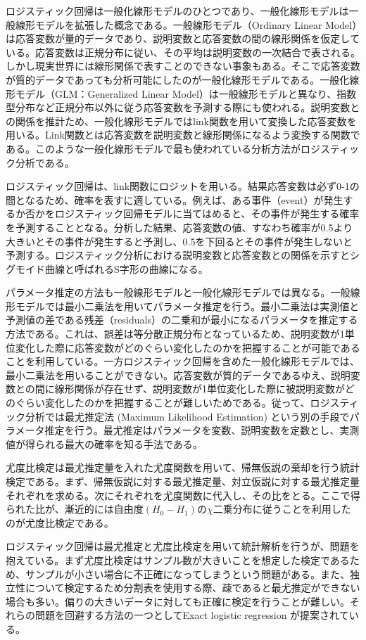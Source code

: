 \documentclass[12pt, dvipdfmx]{jmaster}
\theoremstyle{definition}
\begin{document}
ロジスティック回帰は一般化線形モデルのひとつであり、一般化線形モデルは一般線形モデルを拡張した概念である。一般線形モデル（Ordinary Linear Model）は応答変数が量的データであり、説明変数と応答変数の間の線形関係を仮定している。応答変数は正規分布に従い、その平均は説明変数の一次結合で表される。しかし現実世界には線形関係で表すことのできない事象もある。そこで応答変数が質的データであっても分析可能にしたのが一般化線形モデルである。一般化線形モデル（GLM：Generalized Linear Model）は一般線形モデルと異なり、指数型分布など正規分布以外に従う応答変数を予測する際にも使われる。説明変数との関係を推計ため、一般化線形モデルではlink関数を用いて変換した応答変数を用いる。Link関数とは応答変数を説明変数と線形関係になるよう変換する関数である。このような一般化線形モデルで最も使われている分析方法がロジスティック分析である。

ロジスティック回帰は、link関数にロジットを用いる。結果応答変数は必ず0-1の間となるため、確率を表すに適している。例えば、ある事件（event）が発生するか否かをロジスティック回帰モデルに当てはめると、その事件が発生する確率を予測することとなる。分析した結果、応答変数の値、すなわち確率が0.5より大きいとその事件が発生すると予測し、0.5を下回るとその事件が発生しないと予測する。ロジスティック分析における説明変数と応答変数との関係を示すとシグモイド曲線と呼ばれるS字形の曲線になる。

パラメータ推定の方法も一般線形モデルと一般化線形モデルでは異なる。一般線形モデルでは最小二乗法を用いてパラメータ推定を行う。最小二乗法は実測値と予測値の差である残差（residuals）の二乗和が最小になるパラメータを推定する方法である。これは、誤差は等分散正規分布となっているため、説明変数が1単位変化した際に応答変数がどのぐらい変化したのかを把握することが可能であることを利用している。一方ロジスティック回帰を含めた一般化線形モデルでは、最小二乗法を用いることができない。応答変数が質的データであるゆえ、説明変数との間に線形関係が存在せず、説明変数が1単位変化した際に被説明変数がどのぐらい変化したのかを把握することが難しいためである。従って、ロジスティック分析では最尤推定法 (Maximum Likelihood Estimation) という別の手段でパラメータ推定を行う。最尤推定はパラメータを変数、説明変数を定数とし、実測値が得られる最大の確率を知る手法である。

尤度比検定は最尤推定量を入れた尤度関数を用いて、帰無仮説の棄却を行う統計検定である。まず、帰無仮説に対する最尤推定量、対立仮説に対する最尤推定量それぞれを求める。次にそれぞれを尤度関数に代入し、その比をとる。ここで得られた比が、漸近的には自由度$(H_0 - H_1)$の$χ$二乗分布に従うことを利用したのが尤度比検定である。

ロジスティック回帰は最尤推定と尤度比検定を用いて統計解析を行うが、問題を抱えている。まず尤度比検定はサンプル数が大きいことを想定した検定であるため、サンプルが小さい場合に不正確になってしまうという問題がある。また、独立性について検定するため分割表を使用する際、疎であると最尤推定ができない場合も多い。偏りの大きいデータに対しても正確に検定を行うことが難しい。それらの問題を回避する方法の一つとしてExact logistic regression が提案されている。
\end{document}
